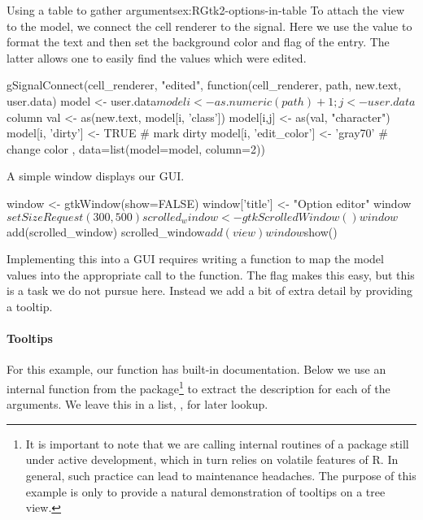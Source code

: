 \begin{example}{Using a table to gather arguments}{ex:RGtk2-options-in-table}
To attach the view to the model, we connect the cell renderer to the
 signal. Here we use the  value to format
the text and then set the background color and  flag of the
entry. The latter allows one to easily find the values which were edited.
\begin{Schunk}
\begin{Sinput}
 gSignalConnect(cell_renderer, "edited", 
     function(cell_renderer, path, new.text, user.data) {
       model <- user.data$model
       i <- as.numeric(path) + 1; j <- user.data$column
       val <- as(new.text, model[i, 'class'])
       model[i,j] <- as(val, "character")   
       model[i, 'dirty'] <- TRUE                 # mark dirty
       model[i, 'edit_color'] <- 'gray70'        # change color
     }, data=list(model=model, column=2))
\end{Sinput}
\end{Schunk}

A simple window displays our GUI.
\begin{Schunk}
\begin{Sinput}
 window <- gtkWindow(show=FALSE)
 window['title'] <- "Option editor"
 window$setSizeRequest(300,500)
 scrolled_window <- gtkScrolledWindow()
 window$add(scrolled_window)
 scrolled_window$add(view)
 window$show()
\end{Sinput}
\end{Schunk}

Implementing this into a GUI requires writing a function to map the
model values into the appropriate call to the  function. The
 flag makes this easy, but this is a task we do not pursue
here. Instead we add a bit of extra detail by providing a tooltip.

\paragraph{Tooltips}
For this example, our function has built-in documentation. Below we
use an internal function from the  package\footnote{It is
  important to note that we are calling internal routines of a package
  still under active development, which in turn relies on volatile
  features of R. In general, such practice can lead to maintenance
  headaches.  The purpose of this example is only to provide a natural
  demonstration of tooltips on a tree view.} to extract the
description for each of the arguments. We leave this in a list,
, for later lookup.
\begin{Schunk}
\end{Schunk}


\end{example}
